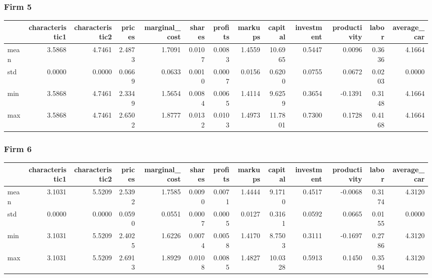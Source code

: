  \subsubsection*{Firm 5}
\begin{tabular}{lrrrrrrrrrrrr}
\toprule
{} &  characteristic1 &  characteristic2 &  prices &  marginal\_cost &  shares &  profits &  markups &  capital &  investment &  productivity &  labor &  average\_car \\
\midrule
mean &           3.5868 &           4.7461 &  2.4873 &         1.7091 &  0.0107 &   0.0083 &   1.4559 &  10.6965 &      0.5447 &        0.0096 & 0.3636 &       4.1664 \\
std  &           0.0000 &           0.0000 &  0.0669 &         0.0633 &  0.0010 &   0.0007 &   0.0156 &   0.6200 &      0.0755 &        0.0672 & 0.0203 &       0.0000 \\
min  &           3.5868 &           4.7461 &  2.3349 &         1.5654 &  0.0084 &   0.0065 &   1.4114 &   9.6259 &      0.3654 &       -0.1391 & 0.3148 &       4.1664 \\
max  &           3.5868 &           4.7461 &  2.6502 &         1.8777 &  0.0132 &   0.0103 &   1.4973 &  11.7801 &      0.7300 &        0.1728 & 0.4168 &       4.1664 \\
\bottomrule
\end{tabular}


 \subsubsection*{Firm 6}
\begin{tabular}{lrrrrrrrrrrrr}
\toprule
{} &  characteristic1 &  characteristic2 &  prices &  marginal\_cost &  shares &  profits &  markups &  capital &  investment &  productivity &  labor &  average\_car \\
\midrule
mean &           3.1031 &           5.5209 &  2.5392 &         1.7585 &  0.0090 &   0.0071 &   1.4444 &   9.1710 &      0.4517 &       -0.0068 & 0.3174 &       4.3120 \\
std  &           0.0000 &           0.0000 &  0.0590 &         0.0551 &  0.0007 &   0.0005 &   0.0127 &   0.3161 &      0.0592 &        0.0665 & 0.0155 &       0.0000 \\
min  &           3.1031 &           5.5209 &  2.4025 &         1.6226 &  0.0074 &   0.0058 &   1.4170 &   8.7503 &      0.3111 &       -0.1697 & 0.2786 &       4.3120 \\
max  &           3.1031 &           5.5209 &  2.6913 &         1.8929 &  0.0108 &   0.0085 &   1.4827 &  10.0328 &      0.5913 &        0.1450 & 0.3594 &       4.3120 \\
\bottomrule
\end{tabular}


